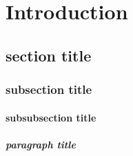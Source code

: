 \chapter{Introduction}
\label{ch:introduction}
\lipsum[1]
\section{section title}
\label{sec:title}
\lipsum[1]
\subsection{subsection title}
\label{subsec:title}
\lipsum[1]
\subsubsection{subsubsection title}
\label{subsubsec:title}
\lipsum[1]
\paragraph{paragraph title}
\label{par:title}
\lipsum[1]
